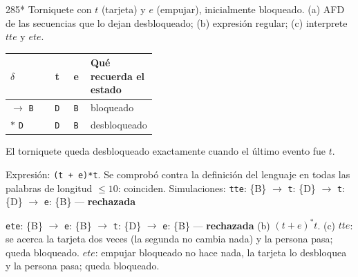 \documentclass[11pt]{article}
\begin{document}
\begin{ejercicio}{285}{*}
Torniquete con $t$ (tarjeta) y $e$ (empujar), inicialmente bloqueado. (a) AFD de las secuencias que lo dejan desbloqueado; (b) expresión regular; (c) interprete $tte$ y $ete$.
\end{ejercicio}
\proc \begin{center}\small\begin{tabular}{lccp{0.42\linewidth}}\toprule
$\delta$ & t & e & Qué recuerda el estado \\\midrule
$\to$ \texttt{B} & \texttt{D} & \texttt{B} & bloqueado \\
$*$ \texttt{D} & \texttt{D} & \texttt{B} & desbloqueado \\
\bottomrule\end{tabular}\end{center}
El torniquete queda desbloqueado exactamente cuando el último evento fue $t$. \par Expresión: \texttt{(t + e)*t}. Se comprobó contra la definición del lenguaje en todas las palabras de longitud $\le 10$: coinciden.
Simulaciones: \texttt{tte}: \{B\} $\to$ \texttt{t}: \{D\} $\to$ \texttt{t}: \{D\} $\to$ \texttt{e}: \{B\} — \textbf{rechazada}\par \texttt{ete}: \{B\} $\to$ \texttt{e}: \{B\} $\to$ \texttt{t}: \{D\} $\to$ \texttt{e}: \{B\} — \textbf{rechazada}
\resp (b) $(t + e)^*t$. (c) $tte$: se acerca la tarjeta dos veces (la segunda no cambia nada) y la persona pasa; queda bloqueado. $ete$: empujar bloqueado no hace nada, la tarjeta lo desbloquea y la persona pasa; queda bloqueado.
\end{document}
